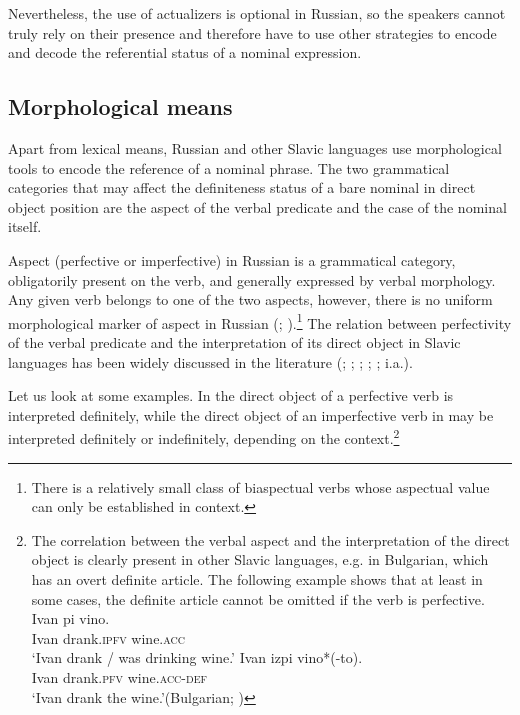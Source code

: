 \documentclass[output=paper,
colorlinks,
citecolor=brown,
newtxmath
]{langscibook}
\begin{document}
\noindent Nevertheless, the use of actualizers is optional in Russian, so the speakers cannot truly rely on their presence and therefore have to use other strategies to encode and decode the referential status of a nominal expression. %

\subsection{%
Morphological means}
Apart from lexical means, Russian and other Slavic languages use %
 morphological tools to encode the reference of a nominal phrase. The two grammatical categories that may affect the definiteness status of a bare nominal in direct object position are the aspect of the verbal predicate and the case of the nominal itself.

Aspect (perfective or imperfective) in Russian is a grammatical category, obligatorily present on the %
verb, and generally expressed by verbal morphology. Any given verb belongs to one of the two aspects, however, there is no uniform morphological marker of aspect in Russian (\citealt{Klein1995}; \citealt{Borik2006}).\footnote{There is a relatively small class of biaspectual verbs whose aspectual value can only be established in  context.} The relation between perfectivity of the verbal predicate and the interpretation of its direct object in Slavic languages has been widely discussed in the literature (\citealt{Wierzbicka1967}; \citealt{Krifka1992}; \citealt{Schoorlemmer1995}; \citealt{Verkuyl1999}; \citealt{Filip1993}; i.a.).

Let us look at some examples. In  the direct object of a perfective verb is interpreted definitely, while the direct object of an imperfective verb in  may be interpreted definitely or indefinitely, depending on the context.\footnote{The correlation between the verbal aspect and the interpretation of the direct object is clearly present in other Slavic languages, e.g. in Bulgarian, which has an overt definite article. The following example shows that at least in some cases, the definite article cannot be omitted if the verb is perfective.
\ea
\ea \label{ex:ia}
\gll	Ivan 	pi 					vino.\\
		Ivan 	drank.\textsc{ipfv} 	wine.\textsc{acc}\\
\glt		`Ivan drank / was drinking wine.'
\ex \label{ex:ib}
\gll Ivan 	izpi 				vino*(-to).\\
		Ivan 	drank.\textsc{pfv} 	wine.\textsc{acc}-\textsc{def}\\
\glt `Ivan drank the wine.'\hfill (Bulgarian; \citealt[944]{Dimitrova-Vulchanova2012})
\z \z
}
\end{document}
